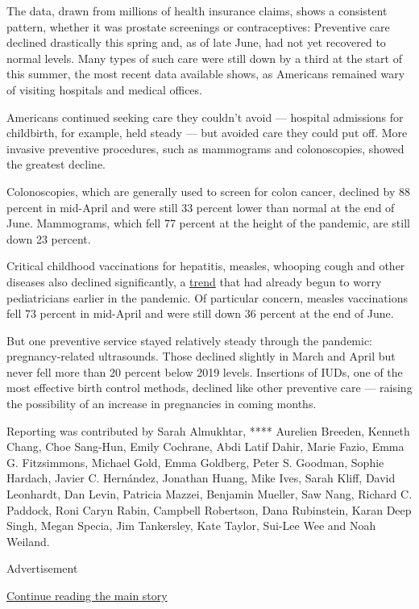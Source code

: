 The data, drawn from millions of health insurance claims, shows a
consistent pattern, whether it was prostate screenings or
contraceptives: Preventive care declined drastically this spring and, as
of late June, had not yet recovered to normal levels. Many types of such
care were still down by a third at the start of this summer, the most
recent data available shows, as Americans remained wary of visiting
hospitals and medical offices.

Americans continued seeking care they couldn't avoid --- hospital
admissions for childbirth, for example, held steady --- but avoided care
they could put off. More invasive preventive procedures, such as
mammograms and colonoscopies, showed the greatest decline.

Colonoscopies, which are generally used to screen for colon cancer,
declined by 88 percent in mid-April and were still 33 percent lower than
normal at the end of June. Mammograms, which fell 77 percent at the
height of the pandemic, are still down 23 percent.

Critical childhood vaccinations for hepatitis, measles, whooping cough
and other diseases also declined significantly, a
\href{https://www.nytimes3xbfgragh.onion/2020/04/23/health/coronavirus-measles-vaccines.html}{trend}
that had already begun to worry pediatricians earlier in the pandemic.
Of particular concern, measles vaccinations fell 73 percent in mid-April
and were still down 36 percent at the end of June.

But one preventive service stayed relatively steady through the
pandemic: pregnancy-related ultrasounds. Those declined slightly in
March and April but never fell more than 20 percent below 2019 levels.
Insertions of IUDs, one of the most effective birth control methods,
declined like other preventive care --- raising the possibility of an
increase in pregnancies in coming months.

Reporting was contributed by Sarah Almukhtar, **** Aurelien Breeden,
Kenneth Chang, Choe Sang-Hun, Emily Cochrane, Abdi Latif Dahir, Marie
Fazio, Emma G. Fitzsimmons, Michael Gold, Emma Goldberg, Peter S.
Goodman, Sophie Hardach, Javier C. Hernández, Jonathan Huang, Mike Ives,
Sarah Kliff, David Leonhardt, Dan Levin, Patricia Mazzei, Benjamin
Mueller, Saw Nang, Richard C. Paddock, Roni Caryn Rabin, Campbell
Robertson, Dana Rubinstein, Karan Deep Singh, Megan Specia, Jim
Tankersley, Kate Taylor, Sui-Lee Wee and Noah Weiland.

Advertisement

\protect\hyperlink{after-bottom}{Continue reading the main story}

